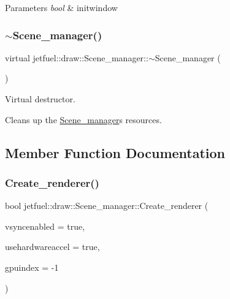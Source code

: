 \begin{DoxyParams}{Parameters}
{\em bool} & initwindow \\
\hline
\end{DoxyParams}
\mbox{\label{classjetfuel_1_1draw_1_1Scene__manager_a7467d1c52f4185a19a9168fdc6bf6e57}} 
\subsubsection{\texorpdfstring{$\sim$\+Scene\+\_\+manager()}{~Scene\_manager()}}
{\footnotesize\ttfamily virtual jetfuel\+::draw\+::\+Scene\+\_\+manager\+::$\sim$\+Scene\+\_\+manager (\begin{DoxyParamCaption}{ }\end{DoxyParamCaption})\hspace{0.3cm}{\ttfamily [virtual]}}



Virtual destructor. 

Cleans up the \hyperlink{classjetfuel_1_1draw_1_1Scene__manager}{Scene\+\_\+manager}\textquotesingle{}s resources. 

\subsection{Member Function Documentation}
\mbox{\label{classjetfuel_1_1draw_1_1Scene__manager_afafecd926ce5e4b2543a6d583a7d24b6}} 
\subsubsection{\texorpdfstring{Create\+\_\+renderer()}{Create\_renderer()}}
{\footnotesize\ttfamily bool jetfuel\+::draw\+::\+Scene\+\_\+manager\+::\+Create\+\_\+renderer (\begin{DoxyParamCaption}\item[{const bool}]{vsyncenabled = {\ttfamily true},  }\item[{const bool}]{usehardwareaccel = {\ttfamily true},  }\item[{const int}]{gpuindex = {\ttfamily -\/1} }\end{DoxyParamCaption})}



